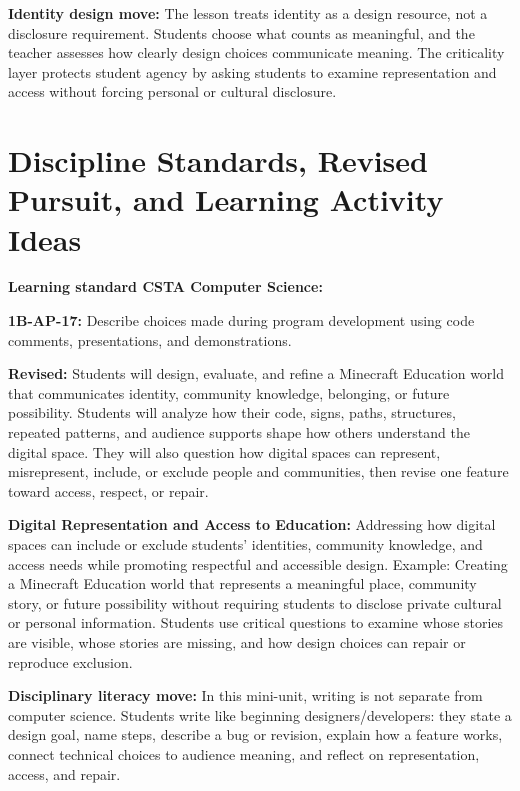 \textbf{Identity design move:} The lesson treats identity as a design resource, not a disclosure requirement. Students choose what counts as meaningful, and the teacher assesses how clearly design choices communicate meaning. \textcolor{LessonTwoAccent}{The criticality layer protects student agency by asking students to examine representation and access without forcing personal or cultural disclosure.}

\section*{Discipline Standards, Revised Pursuit, and Learning Activity Ideas}

\textcolor{LessonTwoAccent}{\textbf{Learning standard CSTA Computer Science:}}

\textcolor{LessonTwoAccent}{\textbf{1B-AP-17:} Describe choices made during program development using code comments, presentations, and demonstrations.}

\textcolor{LessonTwoAccent}{\textbf{Revised:} Students will design, evaluate, and refine a Minecraft Education world that communicates identity, community knowledge, belonging, or future possibility. Students will analyze how their code, signs, paths, structures, repeated patterns, and audience supports shape how others understand the digital space. They will also question how digital spaces can represent, misrepresent, include, or exclude people and communities, then revise one feature toward access, respect, or repair.}

\textcolor{LessonTwoAccent}{\textbf{Digital Representation and Access to Education:} Addressing how digital spaces can include or exclude students' identities, community knowledge, and access needs while promoting respectful and accessible design. Example: Creating a Minecraft Education world that represents a meaningful place, community story, or future possibility without requiring students to disclose private cultural or personal information. Students use critical questions to examine whose stories are visible, whose stories are missing, and how design choices can repair or reproduce exclusion.}

\textcolor{LessonTwoAccent}{\textbf{Disciplinary literacy move:} In this mini-unit, writing is not separate from computer science. Students write like beginning designers/developers: they state a design goal, name steps, describe a bug or revision, explain how a feature works, connect technical choices to audience meaning, and reflect on representation, access, and repair.}

